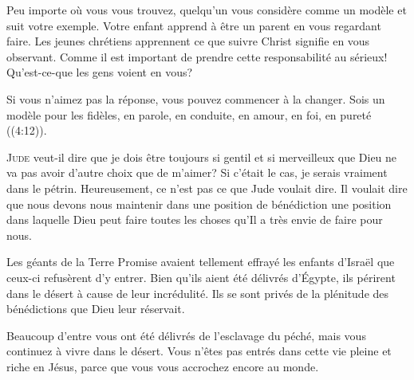 Peu importe où vous vous trouvez, quelqu'un vous considère comme un modèle
 et suit votre exemple. Votre enfant apprend à être un parent en vous
 regardant faire. Les jeunes chrétiens apprennent ce que suivre Christ
 signifie en vous observant. Comme il est important de prendre
 cette responsabilité au sérieux! Qu'est-ce-que les gens voient en vous? 

Si vous n'aimez pas la réponse, vous pouvez commencer à la changer.
 \og Sois un modèle pour les fidèles, en parole, en conduite,
 en amour, en foi, en pureté \fg{} ((4:12)). 

\dvrule







\lettrine{J}{ude} veut-il dire que je dois être toujours 
 si gentil et si merveilleux que Dieu ne va pas avoir
 d'autre choix que de m'aimer?
 Si c'était le cas, je serais vraiment dans le pétrin.
 Heureusement, ce n'est pas ce que Jude voulait dire.
 Il voulait dire que nous devons nous maintenir
 dans une position de bénédiction
 \ocadr une position dans laquelle Dieu peut faire toutes les choses
 qu'Il a très envie de faire pour nous. 

Les géants de la Terre Promise avaient tellement effrayé
 les enfants d'Israël que ceux-ci refusèrent d'y entrer.
 Bien qu'ils aient été délivrés d'Égypte, 
 ils périrent dans le désert à cause de leur incrédulité.
 Ils se sont privés de la plénitude des bénédictions
 que Dieu leur réservait.


Beaucoup d'entre vous ont été délivrés de l'esclavage du péché,
 mais vous continuez à vivre dans le désert.
 Vous n'êtes pas entrés dans cette vie pleine et riche en Jésus,
 parce que vous vous accrochez encore au monde. 

